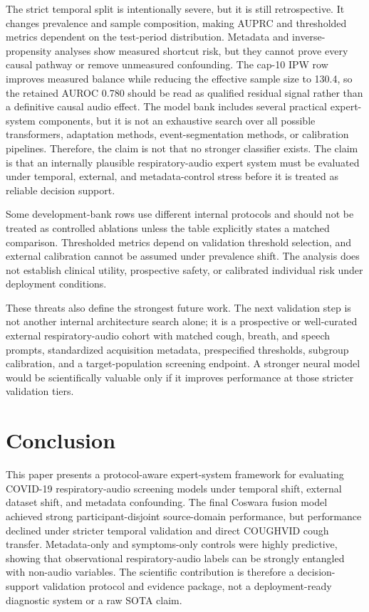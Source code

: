 \documentclass[preprint,12pt]{elsarticle}
\begin{document}
The strict temporal split is intentionally severe, but it is still retrospective. It changes prevalence and sample composition, making AUPRC and thresholded metrics dependent on the test-period distribution. Metadata and inverse-propensity analyses show measured shortcut risk, but they cannot prove every causal pathway or remove unmeasured confounding. The cap-10 IPW row improves measured balance while reducing the effective sample size to 130.4, so the retained AUROC 0.780 should be read as qualified residual signal rather than a definitive causal audio effect. The model bank includes several practical expert-system components, but it is not an exhaustive search over all possible transformers, adaptation methods, event-segmentation methods, or calibration pipelines. Therefore, the claim is not that no stronger classifier exists. The claim is that an internally plausible respiratory-audio expert system must be evaluated under temporal, external, and metadata-control stress before it is treated as reliable decision support.

Some development-bank rows use different internal protocols and should not be treated as controlled ablations unless the table explicitly states a matched comparison. Thresholded metrics depend on validation threshold selection, and external calibration cannot be assumed under prevalence shift. The analysis does not establish clinical utility, prospective safety, or calibrated individual risk under deployment conditions.

These threats also define the strongest future work. The next validation step is not another internal architecture search alone; it is a prospective or well-curated external respiratory-audio cohort with matched cough, breath, and speech prompts, standardized acquisition metadata, prespecified thresholds, subgroup calibration, and a target-population screening endpoint. A stronger neural model would be scientifically valuable only if it improves performance at those stricter validation tiers.

\section{Conclusion}

This paper presents a protocol-aware expert-system framework for evaluating COVID-19 respiratory-audio screening models under temporal shift, external dataset shift, and metadata confounding. The final Coswara fusion model achieved strong participant-disjoint source-domain performance, but performance declined under stricter temporal validation and direct COUGHVID cough transfer. Metadata-only and symptoms-only controls were highly predictive, showing that observational respiratory-audio labels can be strongly entangled with non-audio variables. The scientific contribution is therefore a decision-support validation protocol and evidence package, not a deployment-ready diagnostic system or a raw SOTA claim.
\end{document}
